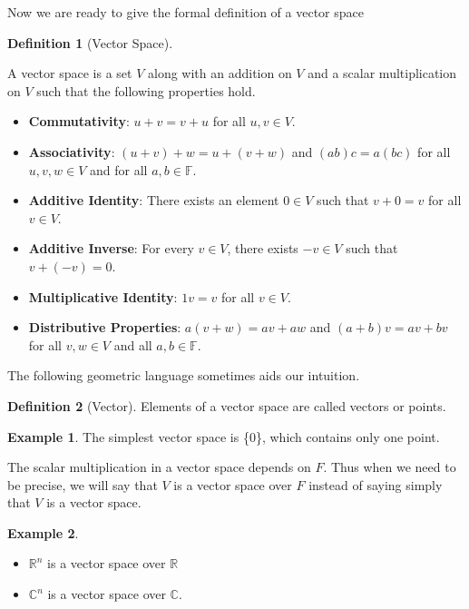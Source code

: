 \documentclass[
]{book}
\providecommand{\tightlist}{%
  \setlength{\itemsep}{0pt}\setlength{\parskip}{0pt}}
\theoremstyle{definition}
\newtheorem{definition}{Definition}[chapter]
\theoremstyle{definition}
\newtheorem{example}{Example}[chapter]
\theoremstyle{definition}
\theoremstyle{definition}
\theoremstyle{remark}
\begin{document}
Now we are ready to give the formal definition of a vector space

\begin{definition}[Vector Space]
\protect\hypertarget{def:unnamed-chunk-25}{}\label{def:unnamed-chunk-25}

A vector space is a set \(V\) along with an addition on \(V\) and a scalar multiplication on \(V\) such that the following properties hold.

\begin{itemize}
\tightlist
\item
  \textbf{Commutativity}: \(u + v = v + u\) for all \(u, v \in V\).
\item
  \textbf{Associativity}: \((u + v) + w = u + (v + w)\) and \((ab)c = a(bc)\) for all \(u, v, w \in V\) and for all \(a, b \in \mathbb{F}\).
\item
  \textbf{Additive Identity}: There exists an element \(0 \in V\) such that \(v + 0 = v\) for all \(v \in V\).
\item
  \textbf{Additive Inverse}: For every \(v \in V\), there exists \(-v \in V\) such that \(v + (-v) = 0\).
\item
  \textbf{Multiplicative Identity}: \(1v = v\) for all \(v \in V\).
\item
  \textbf{Distributive Properties}: \(a(v + w) = av + aw\) and \((a + b)v = av + bv\) for all \(v, w \in V\) and all \(a, b \in \mathbb{F}\).
\end{itemize}

\end{definition}

The following geometric language sometimes aids our intuition.

\begin{definition}[Vector]
\protect\hypertarget{def:unnamed-chunk-26}{}\label{def:unnamed-chunk-26}Elements of a vector space are called vectors or points.
\end{definition}

\begin{example}
\protect\hypertarget{exm:unnamed-chunk-27}{}\label{exm:unnamed-chunk-27}The simplest vector space is \{0\}, which contains only one point.
\end{example}

The scalar multiplication in a vector space depends on \(F\).
Thus when we need to be precise, we will say that \(V\) is a vector space over \(F\) instead of saying simply that \(V\) is a vector space.

\begin{example}
\protect\hypertarget{exm:unnamed-chunk-28}{}\label{exm:unnamed-chunk-28}\leavevmode

\begin{itemize}
\tightlist
\item
  \(\mathbb{R}^n\) is a vector space over \(\mathbb{R}\)
\item
  \(\mathbb{C}^n\) is a vector space over \(\mathbb{C}\).
\end{itemize}

\end{example}
\end{document}
